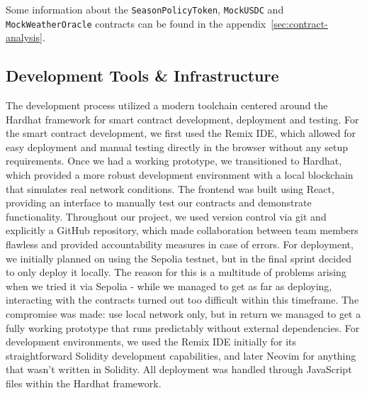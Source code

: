 \documentclass[11pt,a4paper]{article}
\begin{document}
    Some information about the \texttt{SeasonPolicyToken}, \texttt{MockUSDC} and \texttt{MockWeatherOracle} contracts can be found in the appendix~\ref{sec:contract-analysis}.


	\subsection{Development Tools \& Infrastructure}\label{subsec:development-tools-infrastructure}
	The development process utilized a modern toolchain centered around the Hardhat framework for smart contract development, deployment and testing.
	For the smart contract development, we first used the Remix IDE, which allowed for easy deployment and manual testing directly in the browser without any setup requirements.
	Once we had a working prototype, we transitioned to Hardhat, which provided a more robust development environment with a local blockchain that simulates real network conditions.
	The frontend was built using React, providing an interface to manually test our contracts and demonstrate functionality.
	Throughout our project, we used version control via git and explicitly a GitHub repository, which made collaboration between team members flawless and provided accountability measures in case of errors.
	For deployment, we initially planned on using the Sepolia testnet, but in the final sprint decided to only deploy it locally.
	The reason for this is a multitude of problems arising when we tried it via Sepolia - while we managed to get as far as deploying, interacting with the contracts turned out too difficult within this timeframe.
	The compromise was made: use local network only, but in return we managed to get a fully working prototype that runs predictably without external dependencies.
	For development environments, we used the Remix IDE initially for its straightforward Solidity development capabilities, and later Neovim for anything that wasn't written in Solidity.
	All deployment was handled through JavaScript files within the Hardhat framework. 
\end{document}
